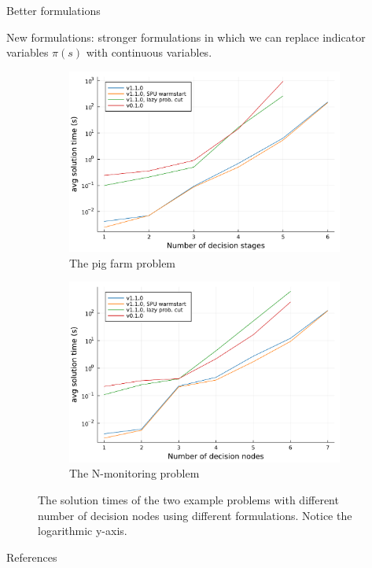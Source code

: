 \documentclass[mathserif,aspectratio=149]{beamer}
\begin{document}
\begin{frame}{Better formulations}

New formulations: \alert{stronger formulations} in which we can replace indicator variables $\pi(s)$ with continuous variables.

\begin{figure}[ht]
\centering
     \begin{subfigure}[b]{0.48\textwidth}
         \centering
         \includegraphics[width=\textwidth]{figures/sol_times_pigfarm.pdf}
         \caption{The pig farm problem}
         \label{fig:sol_times_pigfarm}
     \end{subfigure}
     \hfill
     \begin{subfigure}[b]{0.48\textwidth}
         \centering
         \includegraphics[width=\textwidth]{figures/sol_times_nmonitoring.pdf}
         \caption{The N-monitoring problem}
         \label{fig:sol_times_nmonitoring}
     \end{subfigure}
     \caption{The solution times of the two example problems with different number of decision nodes using different formulations. Notice the logarithmic y-axis.}
     \label{fig:sol_times}
\end{figure}
	
\end{frame}





\frame{
\thispagestyle{empty}
{\setlength{\parskip}{6pt}
\titlepage
}
}
  
\begin{frame}[allowframebreaks]{References}
\scriptsize




\end{frame}
  
    
\end{document}
